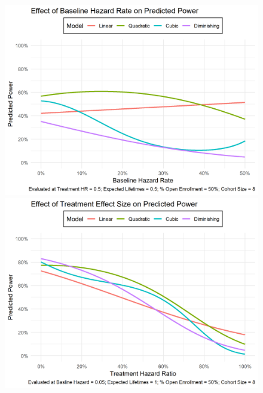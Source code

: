 \begin{figure}
\caption[Effect of Baseline Hazard Rate on Power]{}
\label{fig:power-baseline-hazard}
\includegraphics[width=\textwidth]{reports/figures/single-effects/power-baseline-hazard.png}


\caption[Effect of Treatment Hazard Ratio on Power]{}
\label{fig:power-treatment-hr}
\includegraphics[width=\textwidth]{reports/figures/single-effects/power-treatment-hr.png}
\end{figure}

